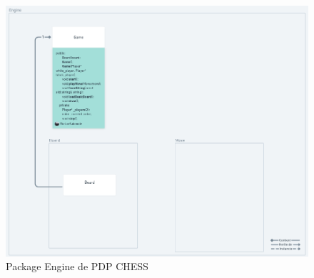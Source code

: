 \huge\documentclass{article}
\begin{document}
    \begin{figure}[!h]
        \centering
        \includegraphics[scale = 0.3]{img/Package/Engine.png}
        \caption{Package Engine de PDP CHESS}
        \label{pck:engine}
    \end{figure}




    \newpage
\end{document}
